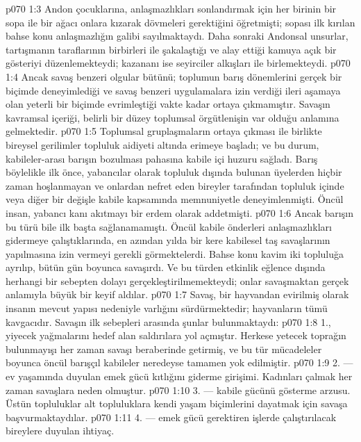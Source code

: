 \vs p070 1:3 Andon çocuklarına, anlaşmazlıkları sonlandırmak için her birinin bir sopa ile bir ağacı onlara kızarak dövmeleri gerektiğini öğretmişti; sopası ilk kırılan bahse konu anlaşmazlığın galibi sayılmaktaydı. Daha sonraki Andonsal unsurlar, tartışmanın taraflarının birbirleri ile şakalaştığı ve alay ettiği kamuya açık bir gösteriyi düzenlemekteydi; kazananı ise seyirciler alkışları ile birlemekteydi.
\vs p070 1:4 Ancak savaş benzeri olgular bütünü; toplumun barış dönemlerini gerçek bir biçimde deneyimlediği ve savaş benzeri uygulamalara izin verdiği ileri aşamaya olan yeterli bir biçimde evrimleştiği vakte kadar ortaya çıkmamıştır. Savaşın kavramsal içeriği, belirli bir düzey toplumsal örgütlenişin var olduğu anlamına gelmektedir.
\vs p070 1:5 Toplumsal gruplaşmaların ortaya çıkması ile birlikte bireysel gerilimler topluluk aidiyeti altında erimeye başladı; ve bu durum, kabileler\hyp{}arası barışın bozulması pahasına kabile içi huzuru sağladı. Barış böylelikle ilk önce, yabancılar olarak topluluk dışında bulunan üyelerden hiçbir zaman hoşlanmayan ve onlardan nefret eden bireyler tarafından topluluk içinde veya diğer bir değişle kabile kapsamında memnuniyetle deneyimlenmişti. Öncül insan, yabancı kanı akıtmayı bir erdem olarak addetmişti.
\vs p070 1:6 Ancak barışın bu türü bile ilk başta sağlanamamıştı. Öncül kabile önderleri anlaşmazlıkları gidermeye çalıştıklarında, en azından yılda bir kere kabilesel taş savaşlarının yapılmasına izin vermeyi gerekli görmektelerdi. Bahse konu kavim iki topluluğa ayrılıp, bütün gün boyunca savaşırdı. Ve bu türden etkinlik eğlence dışında herhangi bir sebepten dolayı gerçekleştirilmemekteydi; onlar savaşmaktan gerçek anlamıyla büyük bir keyif aldılar.
\vs p070 1:7 Savaş, bir hayvandan evirilmiş olarak insanın mevcut yapısı nedeniyle varlığını sürdürmektedir; hayvanların tümü kavgacıdır. Savaşın ilk sebepleri arasında şunlar bulunmaktaydı:
\vs p070 1:8 1.\bibnobreakspace {}, yiyecek yağmalarını hedef alan saldırılara yol açmıştır. Herkese yetecek toprağın bulunmayışı her zaman savaşı beraberinde getirmiş, ve bu tür mücadeleler boyunca öncül barışçıl kabileler neredeyse tamamen yok edilmiştir.
\vs p070 1:9 2. --- ev yaşamında duyulan emek gücü kıtlığını giderme girişimi. Kadınları çalmak her zaman savaşlara neden olmuştur.
\vs p070 1:10 3.\bibnobreakspace {} --- kabile gücünü gösterme arzusu. Üstün topluluklar alt topluluklara kendi yaşam biçimlerini dayatmak için savaşa başvurmaktaydılar.
\vs p070 1:11 4.\bibnobreakspace {} --- emek gücü gerektiren işlerde çalıştırılacak bireylere duyulan ihtiyaç.

